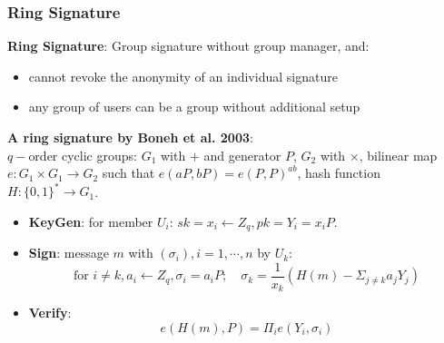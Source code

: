 \begin{frame}\frametitle{Ring Signature}
\textbf{Ring Signature}: Group signature without group manager, and:
\begin{itemize}
\item cannot revoke the anonymity of an individual signature
\item any group of users can be a group without additional setup
\end{itemize}
\textbf{A ring signature by Boneh et al. 2003}:\\
$q-$order cyclic groups: $G_1$ with $+$ and generator $P$, $G_2$ with $\times$, bilinear map $e: G_1 \times G_1 \to G_2$ such that $e(aP, bP)=e(P,P)^{ab}$, 
hash function $H: \{0,1\}^* \to G_1$.
\begin{itemize}
\item \textbf{KeyGen}: for member $U_i$: $sk=x_i \gets Z_q, pk = Y_i = x_iP$.
\item \textbf{Sign}: message $m$ with $(\sigma_i), i=1,\cdots, n$ by $U_k$:
\[\text{for } i\neq k, a_i \gets Z_q, \sigma_i = a_iP;\quad \sigma_k = \frac{1}{x_k}(H(m)-\Sigma_{j\neq k}a_jY_j)\]
\item \textbf{Verify}:
\[ e(H(m),P) = \Pi_ie(Y_i, \sigma_i) \]
\end{itemize}
\end{frame}
